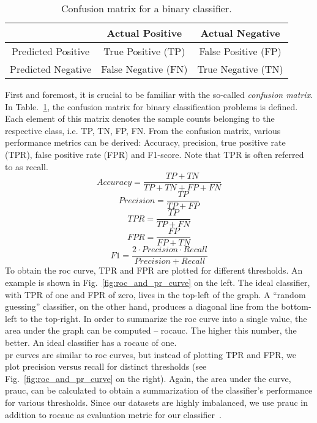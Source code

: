 \begin{table}[]
	\centering
	\begin{tabular}{c|c|c}
		& Actual Positive & Actual Negative  \\ \hline
		Predicted Positive	& True Positive (TP) & False Positive (FP)   \\ \hline
		Predicted Negative &   False Negative (FN)   &  True Negative (TN)  
	\end{tabular}
	\caption{Confusion matrix for a binary classifier.}
	\label{tab:confmatrix}
\end{table}
First and foremost, it is crucial to be familiar with the so-called \textit{confusion matrix}. In Table.~\ref{tab:confmatrix}, the confusion matrix for binary classification problems is defined. Each element of this matrix denotes the sample counts belonging to the respective class, i.e. TP, TN, FP, FN. From the confusion matrix, various performance metrics can be derived: Accuracy, precision, true positive rate (TPR), false positive rate (FPR) and F1-score. Note that TPR is often referred to as recall.
\begin{equation}
Accuracy = \frac{TP + TN}{TP + TN + FP + FN}
\end{equation}
\begin{equation}
Precision = \frac{TP}{TP + FP}
\end{equation}
\begin{equation}
TPR = \frac{TP}{TP + FN}
\end{equation}
\begin{equation}
FPR = \frac{FP}{FP + TN}
\end{equation}
\begin{equation}
F1 = \frac{2 \cdot Precision \cdot Recall}{Precision + Recall}
\end{equation}
To obtain the \gls{roc} curve, TPR and FPR are plotted for different thresholds. An example is shown in Fig.~\ref{fig:roc_and_pr_curve} on the left. The ideal classifier, with TPR of one and FPR of zero, lives in the top-left of the graph. A \enquote{random guessing} classifier, on the other hand, produces a diagonal line from the bottom-left to the top-right. In order to summarize the \gls{roc} curve into a single value, the area under the graph can be computed -- \gls{rocauc}. The higher this number, the better. An ideal classifier has a \gls{rocauc} of one.\\

\Gls{pr} curves are similar to \gls{roc} curves, but instead of plotting TPR and FPR, we plot precision versus recall for distinct thresholds (see Fig.~\ref{fig:roc_and_pr_curve} on the right). Again, the area under the curve, \gls{prauc}, can be calculated to obtain a summarization of the classifier's performance for various thresholds. Since our datasets are highly imbalanced, we use \gls{prauc} in addition to \gls{rocauc} as evaluation metric for our classifier~\cite{davis2006relationship}.

